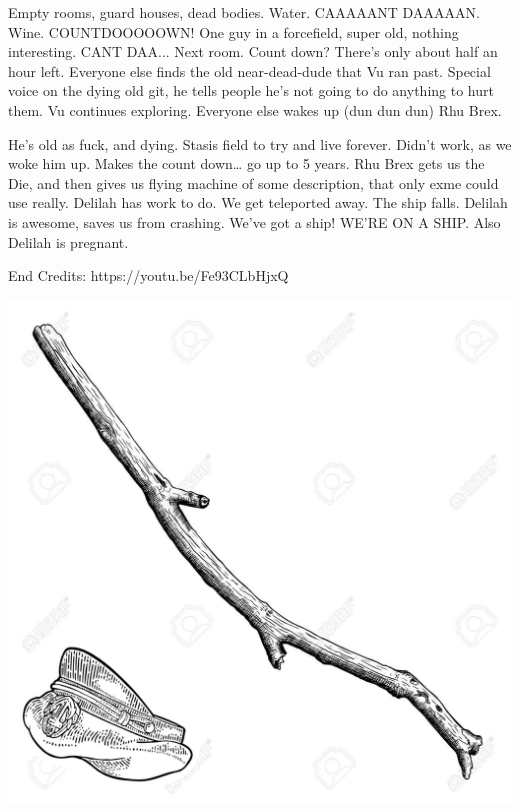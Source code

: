 \begin{multicols}{2}
Empty rooms, guard houses, dead bodies. Water. CAAAAANT DAAAAAN. Wine. COUNTDOOOOOWN! One guy in a forcefield, super old, nothing interesting. CANT DAA... Next room. Count down? There’s only about half an hour left. Everyone else finds the old near-dead-dude that Vu ran past. Special voice on the dying old git, he tells people he’s not going to do anything to hurt them. Vu continues exploring. Everyone else wakes up (dun dun dun) Rhu Brex.\medskip

He’s old as fuck, and dying. Stasis field to try and live forever. Didn’t work, as we woke him up. Makes the count down… go up to 5 years. Rhu Brex gets us the Die, and then gives us flying machine of some description, that only exme could use really. Delilah has work to do. We get teleported away. The ship falls. Delilah is awesome, saves us from crashing. We’ve got a ship! WE’RE ON A SHIP. Also Delilah is pregnant.\medskip

End Credits: https://youtu.be/Fe93CLbHjxQ


\end{multicols}

\vspace*{5mm}

\begin{center}
\includegraphics[width=\textwidth]{./content/img/xxx.jpg}
\begin{figure}[h]
\end{figure}
\end{center}

\clearpage